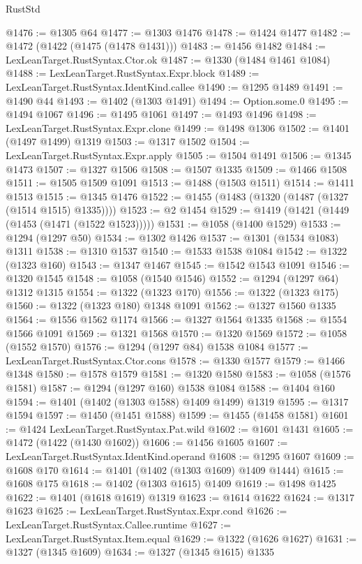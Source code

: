 \begin{lexlean}{RustStd}
\begin{coremodule}
{\begin{coremodule}
{{{{{{{{{{{{{{{{{{{{{{{{{{{{{{{{{{{{{{@1476 := @1305 @64
@1477 := @1303 @1476
@1478 := @1424 @1477
@1482 := @1472 (@1422 (@1475 (@1478 @1431)))
@1483 := @1456 @1482
@1484 := LexLeanTarget.RustSyntax.Ctor.ok
@1487 := @1330 (@1484 @1461 @1084)
@1488 := LexLeanTarget.RustSyntax.Expr.block
@1489 := LexLeanTarget.RustSyntax.IdentKind.callee
@1490 := @1295 @1489
@1491 := @1490 @44
@1493 := @1402 (@1303 @1491)
@1494 := Option.some.{0}
@1495 := @1494 @1067
@1496 := @1495 @1061
@1497 := @1493 @1496
@1498 := LexLeanTarget.RustSyntax.Expr.clone
@1499 := @1498 @1306
@1502 := @1401 (@1497 @1499) @1319
@1503 := @1317 @1502
@1504 := LexLeanTarget.RustSyntax.Expr.apply
@1505 := @1504 @1491
@1506 := @1345 @1473
@1507 := @1327 @1506
@1508 := @1507 @1335
@1509 := @1466 @1508
@1511 := @1505 @1509 @1091
@1513 := @1488 (@1503 @1511)
@1514 := @1411 @1513
@1515 := @1345 @1476
@1522 := @1455 (@1483 (@1320 (@1487 (@1327 (@1514 @1515) @1335))))
@1523 := @2 @1454
@1529 := @1419 (@1421 (@1449 (@1453 (@1471 (@1522 @1523)))))
@1531 := @1058 (@1400 @1529)
@1533 := @1294 (@1297 @50)
@1534 := @1302 @1426
@1537 := @1301 (@1534 @1083) @1311
@1538 := @1310 @1537
@1540 := @1533 @1538 @1084
@1542 := @1322 (@1323 @160)
@1543 := @1347 @1467
@1545 := @1542 @1543 @1091
@1546 := @1320 @1545
@1548 := @1058 (@1540 @1546)
@1552 := @1294 (@1297 @64) @1312 @1315
@1554 := @1322 (@1323 @170)
@1556 := @1322 (@1323 @175)
@1560 := @1322 (@1323 @180) @1348 @1091
@1562 := @1327 @1560 @1335
@1564 := @1556 @1562 @1174
@1566 := @1327 @1564 @1335
@1568 := @1554 @1566 @1091
@1569 := @1321 @1568
@1570 := @1320 @1569
@1572 := @1058 (@1552 @1570)
@1576 := @1294 (@1297 @84) @1538 @1084
@1577 := LexLeanTarget.RustSyntax.Ctor.cons
@1578 := @1330 @1577
@1579 := @1466 @1348
@1580 := @1578 @1579
@1581 := @1320 @1580
@1583 := @1058 (@1576 @1581)
@1587 := @1294 (@1297 @160) @1538 @1084
@1588 := @1404 @160
@1594 := @1401 (@1402 (@1303 @1588) @1409 @1499) @1319
@1595 := @1317 @1594
@1597 := @1450 (@1451 @1588)
@1599 := @1455 (@1458 @1581)
@1601 := @1424 LexLeanTarget.RustSyntax.Pat.wild
@1602 := @1601 @1431
@1605 := @1472 (@1422 (@1430 @1602))
@1606 := @1456 @1605
@1607 := LexLeanTarget.RustSyntax.IdentKind.operand
@1608 := @1295 @1607
@1609 := @1608 @170
@1614 := @1401 (@1402 (@1303 @1609) @1409 @1444)
@1615 := @1608 @175
@1618 := @1402 (@1303 @1615) @1409
@1619 := @1498 @1425
@1622 := @1401 (@1618 @1619) @1319
@1623 := @1614 @1622
@1624 := @1317 @1623
@1625 := LexLeanTarget.RustSyntax.Expr.cond
@1626 := LexLeanTarget.RustSyntax.Callee.runtime
@1627 := LexLeanTarget.RustSyntax.Item.equal
@1629 := @1322 (@1626 @1627)
@1631 := @1327 (@1345 @1609)
@1634 := @1327 (@1345 @1615) @1335
}}}}}}}}}}}}}}}}}}}}}}}}}}}}}}}}}}}}}}
\end{coremodule}}
\end{coremodule}
\end{lexlean}
